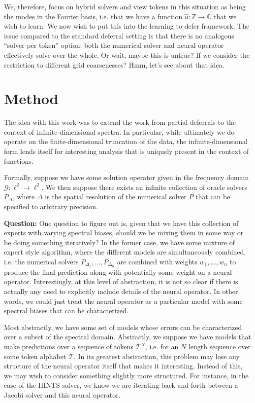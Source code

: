 \documentclass[12pt]{article}
\begin{document}
We, therefore, focus on hybrid solvers and view tokens in this situation as being the modes in the Fourier basis, i.e. that we have a function $\widehat{u} : \mathbb{Z}\to\mathbb{C}$ that we wish to learn. We now wish to put this into the learning to defer framework. The issue compared to the standard deferral setting is that there is no analogous ``solver per token'' option: both the numerical solver and neural operator effectively solve over the whole. Or wait, maybe this is untrue? If we consider the restriction to different grid coarsenesses? Hmm, let's see about that idea.

\newpage
\section{Method}
The idea with this work was to extend the work from partial deferrals to the context of infinite-dimensional spectra. In particular, while ultimately we do operate on the finite-dimensional truncation of the data, the infinite-dimensional form lends itself for interesting analysis that is uniquely present in the context of functions. 

Formally, suppose we have some solution operator given in the frequency domain $\mathcal{G} : \ell^2\to\ell^2$. We then suppose there exists an infinite collection of oracle solvers $P_{\Delta}$, where $\Delta$ is the spatial resolution of the numerical solver $P$ that can be specified to arbitrary precision. 

\textbf{Question:} One question to figure out is, given that we have this collection of experts with varying spectral biases, should we be mixing them in some way or be doing something iteratively? In the former case, we have some mixture of expert style algorithm, where the different models are simultaneously combined, i.e. the numerical solvers $P_{\Delta_1}, ..., P_{\Delta_n}$ are combined with weights $w_1, ..., w_n$ to produce the final prediction along with potentially some weight on a neural operator. Interestingly, at this level of abstraction, it is not so clear if there is actually any need to explicitly include details of the neural operator. In other words, we could just treat the neural operator as a particular model with some spectral biases that can be characterized.

Most abstractly, we have some set of models whose errors can be characterized over a subset of the spectral domain. Abstractly, we suppose we have models that make predictions over a sequence of tokens $\mathcal{T}^{N}$, i.e. for an $N$ length sequence over some token alphabet $\mathcal{T}$. In its greatest abstraction, this problem may lose any structure of the neural operator itself that makes it interesting. Instead of this, we may wish to consider something slightly more structured. For instance, in the case of the HINTS solver, we know we are iterating back and forth between a Jacobi solver and this neural operator. 
\end{document}

